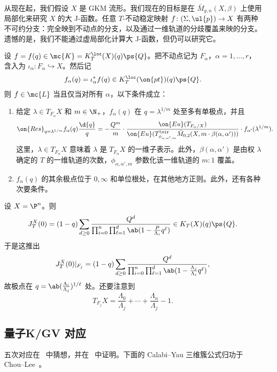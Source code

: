 从现在起，我们假设 \(X\) 是 GKM 流形。我们现在的目标是在 \(\bar{M}_{g,n}(X, \beta)\) 上使用局部化来研究 \(X\) 的大 J-函数。任意 \(T\)-不动稳定映射 \(f \colon (\Sigma, \ul{p}) \to X\) 有两种不可约分支：完全映到不动点的分支，以及通过一维轨道的分歧覆盖来映的分支。遗憾的是，我们不能通过虚局部化计算大 J-函数，但仍可以研究它。

设 \(f = f(q) \in \mc{K} = K_T^{\loc}(X)(q)\ps{Q}\)。把不动点记为 \(F_{\alpha}\)，\(\alpha = 1, \ldots, r\)，含入为 \(\iota_{\alpha} \colon F_{\alpha} \hookrightarrow X\)。然后记
\[ f_{\alpha}(q) = \iota_{\alpha}^* f(q) \in K_T^{\loc}(\on{pt})(q)\ps{Q}. \]
则 \(f \in \mc{L}\) 当且仅当对所有 \(\alpha\)，以下条件成立：
\begin{enumerate}
    \item 给定 \(\lambda \in T_{F_{\alpha}} X\) 和 \(m \in \N_+\)，\(f_{\alpha}(q)\) 在 \(q = \lambda^{1/m}\) 处至多有单极点，并且
        \[ \on{Res}_{q = \lambda^{1/m}} f_{\alpha}(q) \frac{\d{q}}{q} = -\frac{Q^m}{m} \cdot \frac{\on{Eu}(T_{F_{\alpha}/X})}{\on{Eu}(T^{\vir}_{\phi_{\alpha,\alpha',m}}\bar{M}_{0,2}(X, m \cdot \beta(\alpha, \alpha')))} \cdot f_{\alpha'}(\lambda^{1/m}). \]
        这里，\(\lambda \in T_{F_{\alpha}}X\) 意味着 \(\lambda\) 是 \(T_{F_{\alpha}} X\) 的一维子表示。此外，\(\beta(\alpha,\alpha')\) 是由权 \(\lambda\) 确定的 \(T\) 的一维轨道的次数，\(\phi_{\alpha, \alpha', m}\) 参数化该一维轨道的 \(m:1\) 覆盖。
    \item \(f_{\alpha}(q)\) 的其余极点位于 \(0, \infty\) 和单位根处，在其他地方正则。此外，还有各种次要条件。
\end{enumerate}

\begin{exm}
    设 \(X = \P^n\)。则
    \[ J_T^X(0) = (1-q) \sum_{d \geq 0} \frac{Q^d}{\prod_{i=0}^n \prod_{\ell = 1}^d \ab(1 - \frac{P}{\Lambda_i} q^{\ell})} \in K_T(X)(q) \ps{Q}. \]
    于是这推出
    \[ J_T^X(0) |_{F_j} = (1-q) \sum_{d \geq 0} \frac{Q^d}{\prod_{i=0}^n \prod_{\ell = 1}^d \ab(1 - \frac{\Lambda_j}{\Lambda_i}q^{\ell})}, \]
    故极点在 \(q = \ab(\frac{\Lambda_i}{\Lambda_j})^{1/\ell}\) 处。还要注意到
    \[ T_{F_j} X = \frac{\Lambda_0}{\Lambda_j} + \cdots + \frac{\Lambda_n}{\Lambda_j} - 1. \]
\end{exm}

\subsection{量子K/GV 对应}%
\label{sub:Quantum K/GV correspondence}

五次对应在~\cite{GaroufalidisScheidegger2022} 中猜想，并在~\cite{ChouLeeQuintic} 中证明。下面的 Calabi--Yau 三维簇公式归功于 Chou--Lee~\cite{ChouLee2025}。

